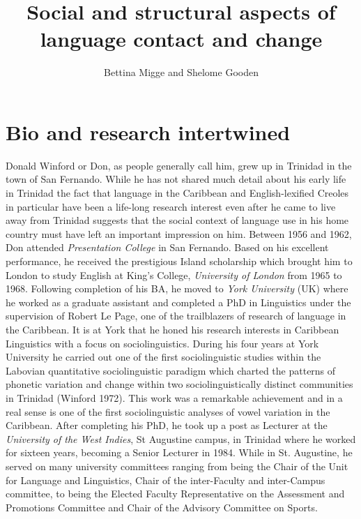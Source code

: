 \documentclass[output=paper, colorlinks,citecolor=brown]{langscibook}
\author{Bettina Migge\affiliation{University of Dublin} and Shelome Gooden\affiliation{University of Pittsburgh}
}
\title{Social and structural aspects of language contact and change}
\begin{document}
\maketitle
 \section{Bio and research intertwined}
 
 Donald Winford or Don, as people generally call him, grew up in Trinidad in the town of San Fernando. While he has not shared much detail about his early life in Trinidad the fact that language in the Caribbean and English-lexified Creoles in particular have been a life-long research interest even after he came to live away from Trinidad suggests that the social context of language use in his home country must have left an important impression on him. Between 1956 and 1962, Don attended \textit{Presentation College} in San Fernando. Based on his excellent performance, he received the prestigious Island scholarship which brought him to London to study English at King's College, \textit{University of London} from 1965 to 1968. Following completion of his BA, he moved to \textit{York University} (UK) where he worked as a graduate assistant and completed a PhD in Linguistics under the supervision of Robert Le Page, one of the trailblazers of research of language in the Caribbean. It is at York that he honed his research interests in Caribbean Linguistics with a focus on sociolinguistics. During his four years at York University he carried out one of the first sociolinguistic studies within the Labovian quantitative sociolinguistic paradigm which charted the patterns of phonetic variation and change within two sociolinguistically distinct communities in Trinidad (Winford 1972). This work was a remarkable achievement and in a real sense is one of the first sociolinguistic analyses of vowel variation in the Caribbean. After completing his PhD, he took up a post as Lecturer at the \textit{University of the West Indies}, St Augustine campus, in Trinidad where he worked for sixteen years, becoming a Senior Lecturer in 1984. While in St. Augustine, he served on many university committees ranging from being the Chair of the Unit for Language and Linguistics, Chair of the inter-Faculty and inter-Campus committee, to being the Elected Faculty Representative on the Assessment and Promotions Committee and Chair of the Advisory Committee on Sports. 
 
\end{document}
